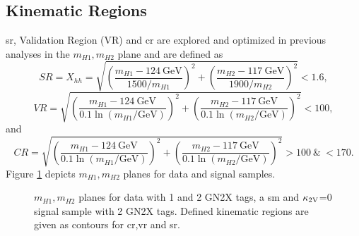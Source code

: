 \subsection{Kinematic Regions}\label{sec:kinematic_regions}
\ac{sr}, Validation Region (VR) and \ac{cr} are explored and optimized in previous analyses \citep{aad2023search,ATL-COM-PHYS-2023-033} in the $m_{H1},m_{H2}$ plane and are defined as
\begin{equation}
    SR=X_{hh} =  \sqrt{\left(\frac{m_{H1} - \SI{124}{\GeV}}{1500 / m_{H1}}\right)^{2} + \left(\frac{m_{H2} - \SI{117}{\GeV}}{1900 / m_{H2}}\right)^{2}} < 1.6,
\end{equation}
\begin{equation}
    \label{VR_Xhh}
    VR =  \sqrt{\left(\frac{m_{H1} - \SI{124}{\GeV}}{0.1 \ln(m_{H1}/\text{GeV})}\right)^{2} + \left(\frac{m_{H2} - \SI{117}{\GeV}}{0.1 \ln(m_{H2}/\text{GeV})}\right)^{2}} < 100,
\end{equation}
and
\begin{equation}
    \label{CR_Xhh}
    CR = \sqrt{\left(\frac{m_{H1} - \SI{124}{\GeV}}{0.1 \ln(m_{H1}/\text{GeV})}\right)^{2} + \left(\frac{m_{H2} - \SI{117}{\GeV}}{0.1 \ln(m_{H2}/\text{GeV})}\right)^{2}} > 100  \ \& \ < 170.
\end{equation}
Figure \ref{fig:m_hh_plane} depicts $m_{H1},m_{H2}$ planes for data and signal samples.
\begin{figure}
    \centering
    \caption[]{ $m_{H1},m_{H2}$ planes for data with 1 and 2 GN2X tags, a \ac{sm} and $\kappa_{\text{2V}}$=0 signal sample with 2 GN2X tags. Defined kinematic regions are given as contours for \ac{cr},\ac{vr} and \ac{sr}.}
    \label{fig:m_hh_plane}
\end{figure}

